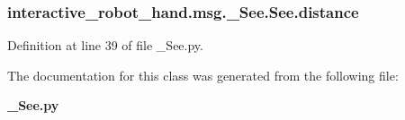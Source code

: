 \subsubsection[{distance}]{\setlength{\rightskip}{0pt plus 5cm}interactive\-\_\-robot\-\_\-hand.\-msg.\-\_\-\-See.\-See.\-distance}\label{classinteractive__robot__hand_1_1msg_1_1__See_1_1See_ae4c00b1ed10e578f8af60706baaec633}


Definition at line 39 of file \-\_\-\-See.\-py.



The documentation for this class was generated from the following file\-:\begin{DoxyCompactItemize}
\item 
{\bf \-\_\-\-See.\-py}\end{DoxyCompactItemize}
